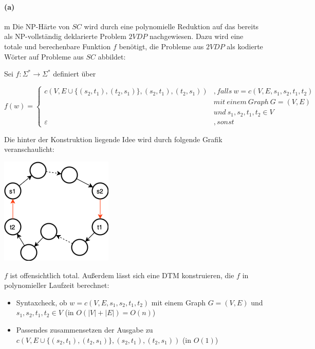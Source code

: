 
\paragraph{(a)}m
	Die NP-Härte von $SC$ wird durch eine polynomielle Reduktion auf das bereits als NP-vollständig deklarierte Problem $2VDP$ nachgewiesen. Dazu wird eine totale und berechenbare Funktion $f$ benötigt, die Probleme aus $2VDP$ als kodierte Wörter auf Probleme aus $SC$ abbildet:

	Sei $f:\Sigma^*\rightarrow \Sigma^*$ definiert über

	$f(w)=\begin{cases}
		c(V,E\cup \{(s_2,t_1),(t_2,s_1)\},(s_2,t_1),(t_2,s_1))&, falls\ w=c(V,E,s_1,s_2,t_1,t_2)\\
		&mit\ einem\ Graph\ G=(V,E)\\
		&und\ s_1,s_2,t_1,t_2 \in V\\
		\varepsilon &, sonst
	\end{cases}$

	Die hinter der Konstruktion liegende Idee wird durch folgende Grafik veranschaulicht:

	\includegraphics[scale=0.5]{sol/thinf/f23t1/skizze_reduktion.png}
	
	$f$ ist offensichtlich total. Außerdem lässt sich eine DTM konstruieren, die $f$ in polynomieller Laufzeit berechnet:
	\begin{itemize}
		\item Syntaxcheck, ob $w=c(V,E,s_1,s_2,t_1,t_2)$ mit einem Graph $G=(V,E)$ und $s_1,s_2,t_1,t_2 \in V$ (in $O(|V|+|E|)=O(n)$)
		\item Passendes zusammensetzen der Ausgabe zu $c(V,E\cup \{(s_2,t_1),(t_2,s_1)\},(s_2,t_1),(t_2,s_1))$ (in $O(1)$)
	\end{itemize}

